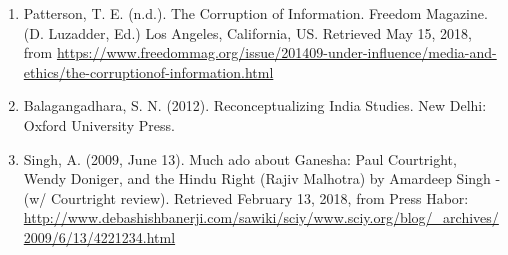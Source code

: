 \begin{multicols}{2}
\begin{enumerate}[label=$\bullet$]
\item Patterson, T. E. (n.d.). The Corruption of Information. Freedom Magazine. (D. Luzadder, Ed.) Los Angeles, California, US. Retrieved May 15, 2018, from \url{https://www.freedommag.org/issue/201409-under-influence/media-and-ethics/the-corruptionof-information.html}

\item Balagangadhara, S. N. (2012). Reconceptualizing India Studies. New Delhi: Oxford
University Press.

\item Singh, A. (2009, June 13). Much ado about Ganesha: Paul Courtright, Wendy Doniger, and
the Hindu Right (Rajiv Malhotra) by Amardeep Singh - (w/ Courtright review). Retrieved February 13, 2018, from Press Habor: \url{http://www.debashishbanerji.com/sawiki/sciy/www.sciy.org/blog/_archives/2009/6/13/4221234.html}
\end{enumerate}

\end{multicols}

